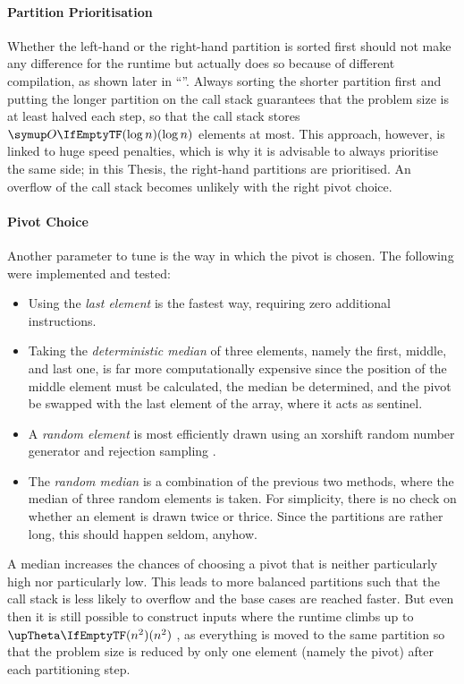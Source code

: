 \paragraph{Partition Prioritisation}
Whether the left-hand or the right-hand partition is sorted first should not make any difference for the runtime but actually does so because of different compilation, as shown later in \enquote{}.
Always sorting the shorter partition first and putting the longer partition on the call stack guarantees that the problem size is at least halved each step, so that the call stack stores \(\bigoh{\log n}\) elements at most.
This approach, however, is linked to huge speed penalties, which is why it is advisable to always prioritise the same side;
in this Thesis, the right-hand partitions are prioritised.
An overflow of the call stack becomes unlikely with the right pivot choice.


\paragraph{Pivot Choice}
Another parameter to tune is the way in which the pivot is chosen.
The following were implemented and tested:
\begin{itemize}
	\item
	Using the \emph{last element} is the fastest way, requiring zero additional instructions.

	\item
	Taking the \emph{deterministic median} of three elements, namely the first, middle, and last one, is far more computationally expensive since the position of the middle element must be calculated, the median be determined, and the pivot be swapped with the last element of the array, where it acts as sentinel.

	\item
	A \emph{random element} is most efficiently drawn using an xorshift random number generator and rejection sampling \cite{lukas_geis}.

	\item
	The \emph{random median} is a combination of the previous two methods, where the median of three random elements is taken.
	For simplicity, there is no check on whether an element is drawn twice or thrice.
	Since the partitions are rather long, this should happen seldom, anyhow.
\end{itemize}
A median increases the chances of choosing a pivot that is neither particularly high nor particularly low.
This leads to more balanced partitions such that the call stack is less likely to overflow and the base cases are reached faster.
But even then it is still possible to construct inputs where the runtime climbs up to \(\bigtheta{n^2}\) \cite{erkiö1984worstcase}, as everything is moved to the same partition so that the problem size is reduced by only one element (namely the pivot) after each partitioning step.

